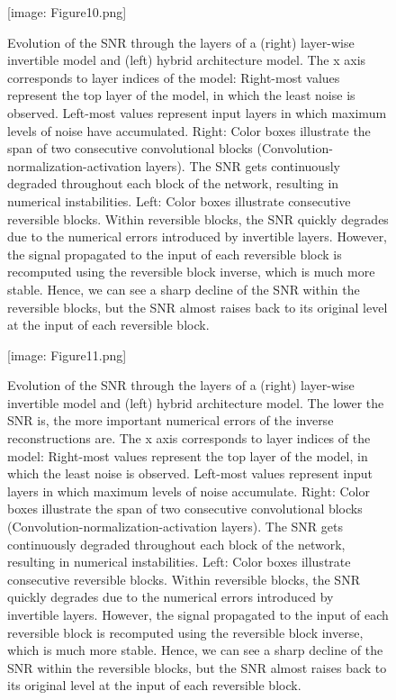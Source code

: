 \documentclass[twocolumn]{bmcart}
\def\texttt{[image: ]}
\begin{document}
\begin{backmatter}
\begin{figure}[t]
\texttt{[image: Figure10.png]}
\caption{
Evolution of the SNR through the layers of a (right) layer-wise invertible model and (left) hybrid architecture model.
The x axis corresponds to layer indices of the model:
Right-most values represent the top layer of the model,
in which the least noise is observed.
Left-most values represent input layers in which maximum levels of noise have accumulated.
Right: Color boxes illustrate the span of two consecutive convolutional blocks (Convolution-normalization-activation layers).
The SNR gets continuously degraded throughout each block of the network, resulting in numerical instabilities.
Left: Color boxes illustrate consecutive reversible blocks.
Within reversible blocks, the SNR quickly degrades due to the numerical errors introduced by invertible layers.
However, the signal propagated to the input of each reversible block is recomputed using the reversible block inverse, which is much more stable.
Hence, we can see a sharp decline of the SNR within the reversible blocks,
but the SNR almost raises back to its original level at the input of each reversible block.
}
\end{figure}

\begin{figure}[t]
\texttt{[image: Figure11.png]}
\caption{
Evolution of the SNR through the layers of a (right) layer-wise invertible model and (left) hybrid architecture model.
The lower the SNR is, the more  important numerical errors of the inverse reconstructions are.
The x axis corresponds to layer indices of the model: Right-most values represent the top layer of the model,
in which the least noise is observed.
Left-most values represent input layers in which maximum levels of noise accumulate.
Right: Color boxes illustrate the span of two consecutive convolutional blocks (Convolution-normalization-activation layers).
The SNR gets continuously degraded throughout each block of the network, resulting in numerical instabilities.
Left: Color boxes illustrate consecutive reversible blocks.
Within reversible blocks, the SNR quickly degrades due to the numerical errors introduced by invertible layers.
However, the signal propagated to the input of each reversible block is recomputed using the reversible block inverse, which is much more stable.
Hence, we can see a sharp decline of the SNR within the reversible blocks,
but the SNR almost raises back to its original level at the input of each reversible block.
}
\end{figure}


\end{backmatter}
\end{document}
